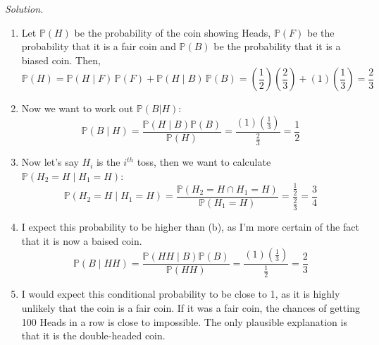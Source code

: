\documentclass[11pt]{article}
\newenvironment{solution}{%
  \noindent\textit{Solution.}\quad
}{\par\bigskip}
\begin{document}
\begin{solution}
\begin{enumerate}
      \item Let $\mathbb{P}(H)$ be the probability of the coin showing Heads, 
            $\mathbb{P}(F)$ be the probability that it is a fair coin and 
            $\mathbb{P}(B)$ be the probability that it is a biased coin. Then, 
            \[
            \mathbb{P}(H) = \mathbb{P}(H \mid F) \, \mathbb{P}(F) + 
                              \mathbb{P}(H \mid B) \, \mathbb{P}(B)
                          = \left(\frac{1}{2}\right) \left(\frac{2}{3}\right)
                              + \left(1\right) \left(\frac{1}{3}\right)
                          = \frac{2}{3}
            \]
      \item Now we want to work out $\mathbb{P}(B|H)$:
            \[
            \mathbb{P}(B \mid H) = \frac{\mathbb{P}(H \mid B) \mathbb{P}(B)}{\mathbb{P}(H)}
                        = \frac{\left(1\right) \left(\frac{1}{3}\right)}
                              {\frac{2}{3}}
                        = \frac{1}{2}
            \]
      \item Now let's say $H_i$ is the $i^{th}$ toss, then we want to calculate 
            $\mathbb{P}(H_2 = H \mid H_1 = H)$:
            \[
            \mathbb{P}(H_2 = H \mid H_1 = H) = \frac{\mathbb{P}(H_2 = H \cap H_1 = H)}
                        {\mathbb{P}(H_1 = H)} = \frac{\frac{1}{2}}{\frac{2}{3}}
                        = \frac{3}{4}
            \]
      \item I expect this probability to be higher than (b), as I'm more certain 
            of the fact that it is now a baised coin.
            \[
            \mathbb{P}(B \mid HH) = \frac{\mathbb{P}(HH \mid B) \mathbb{P}(B)}{\mathbb{P}(HH)}
                        = \frac{\left(1\right) \left(\frac{1}{3}\right)}
                              {\frac{1}{2}} = \frac{2}{3}
            \]
      \item I would expect this conditional probability to be close to 1, as it 
            is highly unlikely that the coin is a fair coin. If it was a fair coin, 
            the chances of getting 100 Heads in a row is close to impossible. The 
            only plausible explanation is that it is the double-headed coin. 
\end{enumerate}
\end{solution}
\end{document}
